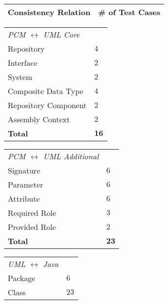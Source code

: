 \begin{table}
    \centering
    \small
    \renewcommand{\arraystretch}{1.2}
    \begin{tabular}{L{13em}C{8em}}
        \toprule
        \textbf{Consistency Relation} & \textbf{\# of Test Cases} \\
        \midrule
    \end{tabular}
    \begin{tabular}{L{13em}C{8em}}
        \textit{\gls{PCM} $\leftrightarrow$ \gls{UML} Core}\\\addlinespace[0.3em]
        Repository              & $4$ \\
        Interface               & $2$ \\
        System                  & $2$ \\
        Composite Data Type     & $4$ \\
        Repository Component    & $2$ \\
        Assembly Context        & $2$ \\%
        \rowcolor{\headinglinecolor}
        \textbf{Total}          & $\mathbf{16}$ \\
        \midrule
    \end{tabular}
    \begin{tabular}{L{13em}C{8em}}
        \textit{\gls{PCM} $\leftrightarrow$ \gls{UML} Additional}\\\addlinespace[0.3em]
        Signature       & $6$ \\
        Parameter       & $6$ \\
        Attribute       & $6$ \\
        Required Role   & $3$ \\
        Provided Role   & $2$ \\%
        \rowcolor{\headinglinecolor}
        \textbf{Total}  & $\mathbf{23}$ \\
        \midrule
    \end{tabular}
    \begin{tabular}{L{13em}C{8em}}
        \textit{\gls{UML} $\leftrightarrow$ Java} \\\addlinespace[0.3em]
        Package                     & $6$ \\
        Class                       & $23$ \\

\end{tabular}
\end{table}
